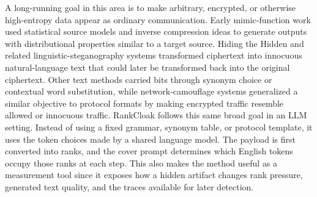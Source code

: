 \documentclass[fleqn,10pt]{wlscirep}
\begin{document}
A long-running goal in this area is to make arbitrary, encrypted, or otherwise high-entropy data appear as ordinary communication. Early mimic-function work used statistical source models and inverse compression ideas to generate outputs with distributional properties similar to a target source\cite{Wayner1992MimicFunctions,Wayner1995StrongTheoreticalSteganography}. Hiding the Hidden and related linguistic-steganography systems transformed ciphertext into innocuous natural-language text that could later be transformed back into the original ciphertext\cite{ChapmanDavida1997HidingHidden,Bennett2004LinguisticSteganography}. Other text methods carried bits through synonym choice or contextual word substitution\cite{ChangClark2014PracticalLinguisticSteganography}, while network-camouflage systems generalized a similar objective to protocol formats by making encrypted traffic resemble allowed or innocuous traffic\cite{Weinberg2012StegoTorus,Dyer2013FormatTransformingEncryption}. RankCloak follows this same broad goal in an LLM setting. Instead of using a fixed grammar, synonym table, or protocol template, it uses the token choices made by a shared language model. The payload is first converted into ranks, and the cover prompt determines which English tokens occupy those ranks at each step. This also makes the method useful as a measurement tool since it exposes how a hidden artifact changes rank pressure, generated text quality, and the traces available for later detection.
\end{document}
